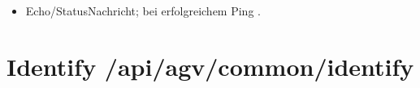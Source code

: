 \documentclass[letterpaper,10pt,english]{sphinxmanual}
\begin{document}
\sphinxAtStartPar
{}
\begin{itemize}
\item {} 
\sphinxAtStartPar
{}  \textendash{} Echo\sphinxhyphen{}/Status\sphinxhyphen{}Nachricht; bei erfolgreichem Ping .

\end{itemize}


\section{Identify \sphinxhyphen{} /api/agv/common/identify}
\label{\detokenize{agv_rest_api_common:post-api-agv-common-identify}}\label{\detokenize{agv_rest_api_common:identify-api-agv-common-identify}}
\end{document}

